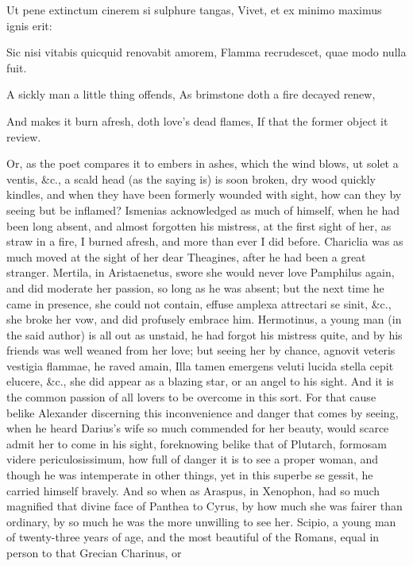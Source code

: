 {Ut pene extinctum cinerem si sulphure tangas,
Vivet, et ex minimo maximus ignis erit:

Sic nisi vitabis quicquid renovabit amorem,
Flamma recrudescet, quae modo nulla fuit.


A sickly man a little thing offends,
As brimstone doth a fire decayed renew,

And makes it burn afresh, doth love's dead flames,
If that the former object it review.

Or, as the poet compares it to embers in ashes, which the wind blows,
ut solet a ventis, \&c., a scald head (as the saying is) is soon
broken, dry wood quickly kindles, and when they have been formerly
wounded with sight, how can they by seeing but be inflamed? Ismenias
acknowledged as much of himself, when he had been long absent, and
almost forgotten his mistress, at the first sight of her, as
straw in a fire, I burned afresh, and more than ever I did before.
Chariclia was as much moved at the sight of her dear Theagines,
after he had been a great stranger. Mertila, in Aristaenetus,
swore she would never love Pamphilus again, and did moderate her
passion, so long as he was absent; but the next time he came in
presence, she could not contain, effuse amplexa attrectari se sinit,
\&c., she broke her vow, and did profusely embrace him. Hermotinus, a
young man (in the said author) is all out as unstaid, he had
forgot his mistress quite, and by his friends was well weaned from her
love; but seeing her by chance, agnovit veteris vestigia flammae, he
raved amain, Illa tamen emergens veluti lucida stella cepit elucere,
\&c., she did appear as a blazing star, or an angel to his sight. And it
is the common passion of all lovers to be overcome in this sort. For
that cause belike Alexander discerning this inconvenience and danger
that comes by seeing, when he heard Darius's wife so much
commended for her beauty, would scarce admit her to come in his sight,
foreknowing belike that of Plutarch, formosam videre periculosissimum,
how full of danger it is to see a proper woman, and though he was
intemperate in other things, yet in this superbe se gessit, he carried
himself bravely. And so when as Araspus, in Xenophon, had so much
magnified that divine face of Panthea to Cyrus, by how much she
was fairer than ordinary, by so much he was the more unwilling to see
her. Scipio, a young man of twenty-three years of age, and the most
beautiful of the Romans, equal in person to that Grecian Charinus, or
}
